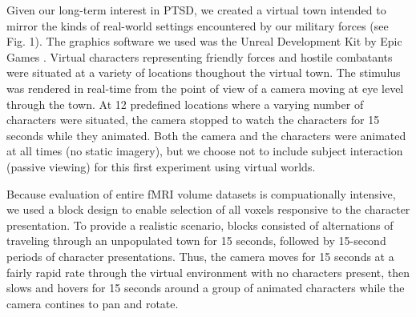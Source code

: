 \documentclass[preprint,5p,authoryear]{elsarticle}
\begin{document}
Given our long-term interest in PTSD, we created a virtual town intended to mirror the kinds of real-world settings encountered by our military forces (see Fig. 1).
The graphics software we used was the Unreal Development Kit by Epic Games  \citep{UnrealEngine2}.
Virtual characters representing friendly forces and hostile combatants were situated at a variety of locations thoughout the virtual town.
The stimulus was rendered in real-time from the point of view of a camera moving at eye level through the town. 
At 12 predefined locations where a varying number of characters were situated, the camera stopped to watch the characters for 15 seconds while they animated.
Both the camera and the characters were animated at all times (no static imagery), but we choose not to include subject interaction (passive viewing) for this first experiment using virtual worlds.

Because evaluation of entire fMRI volume datasets is compuationally intensive, we used a block design to enable selection of all voxels responsive to the character presentation.
To provide a realistic scenario, blocks consisted of alternations of traveling through an unpopulated town for 15 seconds, followed by 15-second periods of character presentations.
Thus, the camera moves for 15 seconds at a fairly rapid rate through the virtual environment with no characters present, then slows and hovers for 15 seconds around a group of animated characters while the camera contines to pan and rotate.
\end{document}
